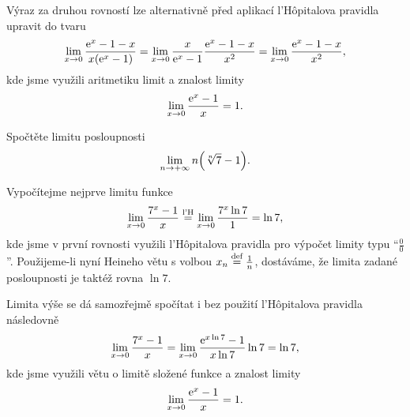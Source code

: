 \documentclass[answers]{exam}
\begin{document}
\begin{questions}
\begin{solution}
  Výraz za druhou rovností lze alternativně před aplikací l'Hôpitalova pravidla upravit do tvaru
  \begin{equation*}
  \lim_{x \to 0} \frac{\exponential{x} - 1 - x}{x \parens{\exponential{x} - 1}}
  =
  \lim_{x \to 0} \frac{x}{\exponential{x} - 1} \frac{\exponential{x} - 1 - x}{x^2}
  =
  \lim_{x \to 0} \frac{\exponential{x} - 1 - x}{x^2},
  \end{equation*}
  kde jsme využili aritmetiku limit a znalost limity
  \begin{equation*}
    \lim_{x \to 0} \frac{\mathrm{e}^{x} - 1}{x} = 1.
  \end{equation*}
  \end{solution}
  
  \question[2] Spočtěte limitu posloupnosti
  \begin{equation*}
    \lim_{n \to +\infty} n \parens{\sqrt[n]{7} - 1}.
  \end{equation*}
  
  \begin{solution}
  Vypočítejme nejprve limitu funkce
  \begin{equation*}
    \lim_{x \to 0} \frac{7^x - 1}{x}
    \stackrel{\text{l'H}}{=}
    \lim_{x \to 0} \frac{7^x \ln 7}{1}
    =
    \ln 7,
  \end{equation*}
  kde jsme v první rovnosti využili l'Hôpitalova pravidla pro výpočet limity typu ``$\frac{0}{0}$''. Použijeme-li nyní Heineho větu s volbou $x_n \stackrel{\text{def}}{=} \frac{1}{n}$, dostáváme, že limita zadané posloupnosti je taktéž rovna $\ln 7$.  
  
  Limita výše se dá samozřejmě spočítat i bez použití l'Hôpitalova pravidla následovně
  \begin{equation*}
    \lim_{x \to 0} \frac{7^x - 1}{x}
    =
    \lim_{x \to 0} \frac{\mathrm{e}^{x \ln 7} - 1}{x \ln 7} \ln 7
    =
    \ln 7,
  \end{equation*}
  kde jsme využili větu o limitě složené funkce a znalost limity
  \begin{equation*}
    \lim_{x \to 0} \frac{\mathrm{e}^{x} - 1}{x} = 1.
  \end{equation*}
  \end{solution}
   
\end{questions}
\end{document}
